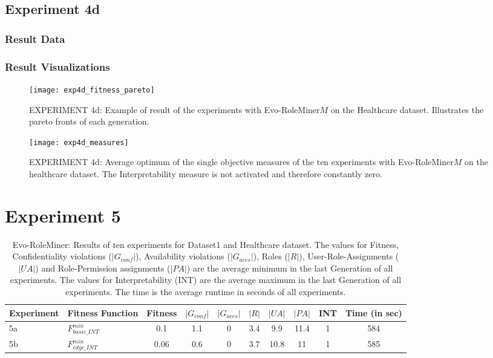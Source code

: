 	\subsection{Experiment 4d}
	\label{sec:A_Exp4d}
		\subsubsection{Result Data}
		\label{sec:A_Exp4d_Data}
		\subsubsection{Result Visualizations}
		\label{sec:A_Exp4d_Diagrams}
			\begin{figure}[H]
				\centering
				\texttt{[image: exp4d\_fitness\_pareto]}
				\caption{EXPERIMENT 4d: Example of result of the experiments with Evo-RoleMiner$M$ on the Healthcare dataset. Illustrates the pareto fronts of each generation.}
				\label{fig:exp4d_fitness_pareto}
			\end{figure}
			\begin{figure}[H]
				\centering
				\texttt{[image: exp4d\_measures]}
				\caption{EXPERIMENT 4d: Average optimum of the single objective measures of the ten experiments with Evo-RoleMiner$M$ on the healthcare dataset. The Interpretability measure is not activated and therefore constantly zero.}
				\label{fig:exp4d_measures}
			\end{figure}
		
\section{Experiment 5}
\label{sec:A_Exp5}
	\begin{table}
		\centering
		\caption{Evo-RoleMiner: Results of ten experiments for Dataset1 and Healthcare dataset. The values for Fitness, Confidentiality violations ($|G_{conf}|$), Availability violations ($|G_{accs}|$), Roles ($|R|$), User-Role-Assignments ($|UA|$) and Role-Permission assignments ($|PA|$) are the average minimum in the last Generation of all experiments. The values for Interpretability (INT) are the average maximum in the last Generation of all experiments. The time is the average runtime in seconds of all experiments.}
		\label{tab:exp5_results}
		\begin{adjustbox}{width=\textwidth}
			\begin{tabular}{|l|l|c|c|c|c|c|c|c|c|}
				\hline
				\rowcolor{myGray} 
				\textbf{Experiment} & \textbf{Fitness Function} & \textbf{Fitness} & \textbf{$|G_{conf}|$} & \textbf{$|G_{accs}|$} & \textbf{$|R|$} & \textbf{$|UA|$} & \textbf{$|PA|$} & \textbf{INT} & \textbf{Time (in sec)}\\ \hline
				5a & $F_{basic\_INT}^{min}$ &   0.1  &   1.1   &   0   &   3.4   &   9.9   &   11.4   &   1   &   584\\ \hline
				5b & $F_{edge\_INT}^{min}$ &   0.06   &   0.6   &   0   &   3.7   &   10.8   &   11   &   1   &   585\\ \hline
			\end{tabular}
		\end{adjustbox}
	\end{table}